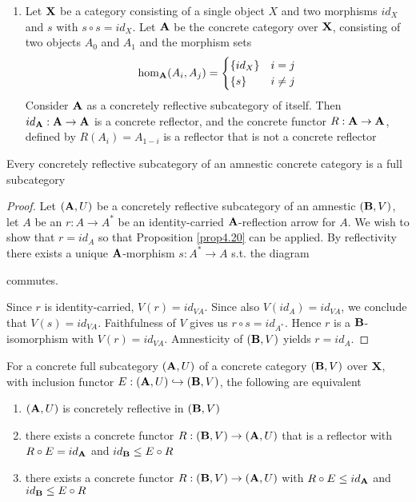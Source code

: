 \documentclass[11pt]{article}
\begin{document}
\begin{examplle}[]
\begin{enumerate}
\item Let \(\operatorname{\textbf{X}}\) be a category consisting of a single object \(X\) and two
morphisms \(id_X\) and \(s\) with \(s\circ s=id_X\). Let \(\operatorname{\textbf{A}}\) be the
concrete category over \(\operatorname{\textbf{X}}\), consisting of two objects \(A_0\) and
\(A_1\) and the morphism sets
\begin{equation*}
\operatorname{hom}_{\operatorname{\textbf{A}}}(A_i,A_j)=
\begin{cases}
\{id_X\}&i=j\\
\{s\}&i\neq j
\end{cases}
\end{equation*}
Consider \(\operatorname{\textbf{A}}\) as a concretely reflective subcategory of itself. Then
\(id_{\operatorname{\textbf{A}}}:\operatorname{\textbf{A}}\to\operatorname{\textbf{A}}\) is a concrete reflector, and the concrete functor
\(R:\operatorname{\textbf{A}}\to\operatorname{\textbf{A}}\), defined by \(R(A_i)=A_{1-i}\) is a reflector that is not
a concrete reflector
\end{enumerate}
\end{examplle}

\begin{proposition}[]
Every concretely reflective subcategory of an amnestic concrete category is a
full subcategory
\end{proposition}

\begin{proof}
Let \((\operatorname{\textbf{A}},U)\) be a concretely reflective subcategory of an amnestic
\((\operatorname{\textbf{B}},V)\), let \(A\) be an \(r:A\to A^*\) be an identity-carried
\(\operatorname{\textbf{A}}\)-reflection arrow for \(A\). We wish to show that \(r=id_A\) so that
Proposition \ref{prop4.20} can be applied. By reflectivity there exists a
unique \(\operatorname{\textbf{A}}\)-morphism \(s:A^*\to A\) s.t. the diagram
\begin{center}\end{center}
commutes.

Since \(r\) is identity-carried, \(V(r)=id_{VA}\). Since also
\(V(id_A)=id_{VA}\), we conclude that \(V(s)=id_{VA}\). Faithfulness of \(V\)
gives us \(r\circ s=id_{A^*}\). Hence \(r\) is a \(\operatorname{\textbf{B}}\)-isomorphism with
\(V(r)=id_{VA}\). Amnesticity of \((\operatorname{\textbf{B}},V)\) yields \(r=id_A\). 
\end{proof}

\begin{proposition}[]
For a concrete full subcategory \((\operatorname{\textbf{A}},U)\) of a concrete category
\((\operatorname{\textbf{B}},V)\) over \(\operatorname{\textbf{X}}\), with inclusion functor
\(E:(\operatorname{\textbf{A}},U)\hookrightarrow(\operatorname{\textbf{B}},V)\), the following are equivalent
\begin{enumerate}
\item \((\operatorname{\textbf{A}},U)\) is concretely reflective in \((\operatorname{\textbf{B}},V)\)
\item there exists a concrete functor \(R:(\operatorname{\textbf{B}},V)\to(\operatorname{\textbf{A}},U)\) that is a
reflector with \(R\circ E=id_{\operatorname{\textbf{A}}}\) and \(id_{\operatorname{\textbf{B}}}\le E\circ R\)
\item there exists a concrete functor \(R:(\operatorname{\textbf{B}},V)\to(\operatorname{\textbf{A}},U)\) with \(R\circ E\le
      id_{\operatorname{\textbf{A}}}\) and \(id_{\operatorname{\textbf{B}}}\le E\circ R\)
\end{enumerate}
\end{proposition}
\end{document}
